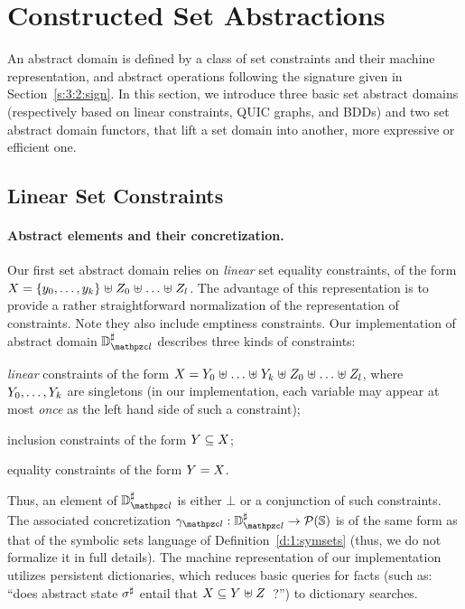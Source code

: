 \section{Constructed Set Abstractions}
\label{sec:constructed}
An abstract domain is defined by a class of set constraints and their machine
representation, and abstract operations following the signature given in
Section~\ref{s:3:2:sign}.
In this section, we introduce three basic set abstract domains (respectively
based on linear constraints, QUIC graphs, and BDDs) and two set abstract
domain functors, that lift a set domain into another, more expressive or
efficient one.

\subsection{Linear Set Constraints}
\label{s:4:1:lin}
\newcommand{\adomlin}{\adom_{\zcl}}
\newcommand{\gammalin}{\gamma_{\zcl}}
\paragraph{Abstract elements and their concretization.}
Our first set abstract domain relies on {\em linear} set equality
constraints, of the form \( X = \{ y_0, \ldots, y_k \} \mathrel{\uplus}
Z_0 \mathrel{\uplus} \ldots \mathrel{\uplus} Z_l \).
The advantage of this representation is to provide a rather straightforward
normalization of the representation of constraints.
Note they also include emptiness constraints.
Our implementation of abstract domain \( \adomlin \) describes three kinds
of constraints:
\begin{compactitem}
\item {\em linear} constraints of the form \( X = Y_0 \mathrel{\uplus}
  \ldots \mathrel{\uplus} Y_k \mathrel{\uplus} Z_0 \mathrel{\uplus} \ldots \mathrel{\uplus}
  Z_l \), where \( Y_0, \ldots, Y_k \) are singletons
  (in our implementation, each variable may appear at most {\em once}
  as the left hand side of such a constraint);
\item inclusion constraints of the form \( Y \subseteq X \);
\item equality constraints of the form \( Y = X \).
\end{compactitem}
Thus, an element of \( \adomlin \) is either \( \bot \) or a conjunction of
such constraints.
The associated concretization \( \gammalin: \adomlin \rightarrow
\partsof{\states} \) is of the same form as that of the symbolic sets
language of Definition~\ref{d:1:symsets} (thus, we do not formalize it
in full details).
The machine representation of our implementation utilizes persistent
dictionaries, which reduces basic queries for facts (such as: ``does
abstract state \( {\sigma}^{\sharp} \) entail that \( X \subseteq Y
\mathrel{\uplus} Z \)~?'') to dictionary searches.

